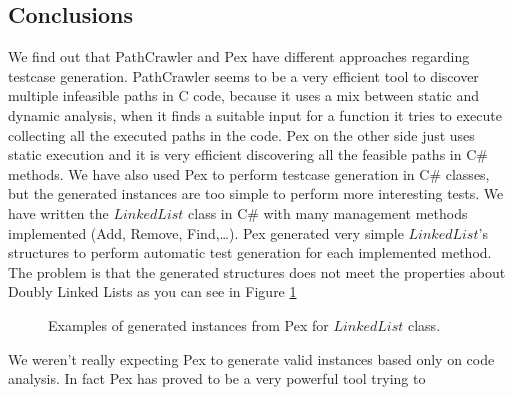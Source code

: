 \documentclass[10pt, conference, compsocconf]{IEEEtran}
\begin{document}
\subsection{Conclusions}
We find out that PathCrawler and Pex have different approaches regarding testcase generation. PathCrawler seems to be a very efficient tool to discover multiple
infeasible paths in C code, because it uses a mix between static and dynamic analysis, when it finds a suitable input for a function it tries to execute
collecting all the executed paths in the code.
Pex on the other side just uses static execution and it is very efficient discovering all the feasible paths in C\# methods. We have also used Pex
to perform testcase generation in C\# classes, but the generated instances are too simple to perform more interesting tests. We have written the $LinkedList$ class
in C\# with many management methods implemented (Add, Remove, Find,\ldots). Pex generated very simple $LinkedList$'s structures to perform automatic test generation
for each implemented method. The problem is that the generated structures does not meet the properties about Doubly Linked Lists as you can see in Figure \ref{fig:pexG}
\begin{figure}[!ht]
\centerline{
\hfil
{}}
\caption{Examples of generated instances from Pex for $LinkedList$ class.}
\label{fig:pexG}
\end{figure}
We weren't really expecting Pex to generate valid instances based only on code analysis. In fact Pex has proved to be a very powerful tool trying to
\end{document}
